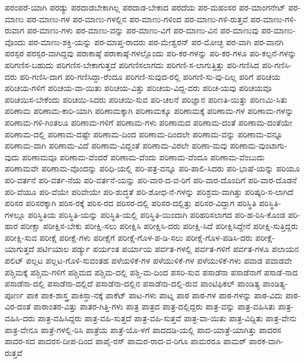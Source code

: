 {ಪರಂಪರೆ-ಯಾಗಿ
ಪರಡ್ಯು
ಪರದಾಡಬೇಕಾಗಿಲ್ಲ
ಪರದಾಡ-ಬೇಕಾದ
ಪರದೆಯ
ಪರ-ಮಹಂಸರ
ಪರ-ಮಾಂಗನೇಟ್
ಪರ-ಮಾಣು
ಪರ-ಮಾಣು-ಗಳ
ಪರ-ಮಾಣು-ಗಳಲ್ಲಿನ
ಪರ-ಮಾಣು-ಗಳಿಂದ
ಪರ-ಮಾಣು-ಗಳಿ-ರುತ್ತವೆ
ಪರ-ಮಾಣು-ಗಳಿ-ರುವಾಗ
ಪರ-ಮಾಣು-ಗಳು
ಪರ-ಮಾಣು-ವನ್ನು
ಪರ-ಮಾಣು-ವಿಗೆ
ಪರ-ಮಾಣು-ವಿನ
ಪರ-ಮಾಣುವು
ಪರ-ಮಾಣು-ವೊಂದು
ಪರ-ಮಾಣು-ಶಕ್ತಿ-ಯನ್ನು
ಪರ-ಮಾಪ್ತ-ರಾದರು
ಪರ-ಮೇಶ್ವರನ್
ಪರ-ಮೋಚ್ಛ
ಪರ-ವಾಗಿ
ಪರ-ವಾನಗಿ
ಪರಸ್ಪರ
ಪರಸ್ಪರ-ವಾಗಿದ್ದವು
ಪರಾಕಾಷ್ಠೆ
ಪರಾಕಾಷ್ಠೆ-ಗಳಲ್ಲೊಂದು
ಪರಿ-ಕರ-ಗಳನ್ನು
ಪರಿ-ಕರ-ಗಳೂ
ಪರಿ-ಕಲ್ಪನೆ-ಗಳನ್ನು
ಪರಿಗಣಿಸ-ಬಹುದು
ಪರಿಗಣಿಸ-ಬೇಕಾಗುತ್ತದೆ
ಪರಿಗಣಿಸಲಾಗದು
ಪರಿಗಣಿ-ಸ-ಲಾಗುತ್ತಿತ್ತು
ಪರಿ-ಗಣಿಸಿದ
ಪರಿ-ಗಣಿಸಿ-ದರು
ಪರಿ-ಗಣಿಸಿ-ದಾಗ
ಪರಿ-ಗಣಿಸಿದ್ದಾ-ರೆಂದೂ
ಪರಿಗಣಿ-ಸುವುದ-ರಲ್ಲಿ
ಪರಿಗಣಿ-ಸು-ವು-ದಿಲ್ಲ
ಪರಿಗೆ
ಪರಿಚಯ
ಪರಿಚಯ-ಗಳಿಗೆ
ಪರಿಚಯ-ವಾ-ಯಿತು
ಪರಿಚಯ-ವಿತ್ತು
ಪರಿಚಯ-ವಿದ್ದ-ವರು
ಪರಿಚ-ಯವು
ಪರಿಚಯವೂ
ಪರಿಚಯಿಸ-ಬೇಕೆಂದು
ಪರಿಚಯಿ-ಸಿದರು
ಪರಿಚಯಿ-ಸುವ
ಪರಿ-ಚಲನೆ
ಪರಿಜ್ಞಾನ
ಪರಿಣತಿ-ಯಿತ್ತು
ಪರಿಣಮಿ-ಸಿತು
ಪರಿಣಾಮ
ಪರಿಣಾಮ-ಕಾರಿ-ಯಾಗಿ
ಪರಿಣಾಮಕ್ಕಾಗಿ
ಪರಿಣಾಮಕ್ಕೂ
ಪರಿಣಾಮಕ್ಕೆ
ಪರಿಣಾಮ-ಗಳ
ಪರಿಣಾಮ-ಗಳನ್ನು
ಪರಿಣಾಮ-ಗಳಿ-ಗಿಂತಲೂ
ಪರಿಣಾಮ-ಗಳಿಗೆ
ಪರಿಣಾಮ-ಗಳು
ಪರಿಣಾಮದ
ಪರಿಣಾಮ-ದಂತೆ
ಪರಿಣಾಮ-ದಂತೆಯೇ
ಪರಿಣಾಮ-ದಲ್ಲಿ
ಪರಿಣಾಮ-ದಷ್ಟೇ
ಪರಿಣಾಮ-ದಿಂದ
ಪರಿಣಾಮ-ದಿಂದಲೇ
ಪರಿಣಾಮ-ವನ್ನು
ಪರಿಣಾಮ-ವನ್ನೂ
ಪರಿಣಾಮ-ವಾಗಿ
ಪರಿಣಾಮ-ವಿದೆ
ಪರಿಣಾಮ-ವಿದ್ದಂತೆ
ಪರಿಣಾಮ-ವಿರಲೇ
ಪರಿಣಾ-ಮವು
ಪರಿಣಾಮ-ವುಂಟಾಗು-ವುದು
ಪರಿಣಾಮವೂ
ಪರಿಣಾಮ-ವೆಂದರೆ
ಪರಿಣಾಮ-ವೆಂದು
ಪರಿಣಾಮ-ವೆಂದೂ
ಪರಿಣಾಮ-ವೆಂಬುದು
ಪರಿಣಾಮವೇ
ಪರಿಣಾಮ-ವೊಂದನ್ನು
ಪರಿಧಿ-ಯಲ್ಲಿ
ಪರಿ-ಪತ್ರ-ವನ್ನೂ
ಪರಿ-ಪಾಲಿ-ಸಿದರು
ಪರಿ-ಭಾಷೆ-ಯನ್ನು
ಪರಿಯೂ
ಪರಿ-ವರ್ತನೆ
ಪರಿ-ವರ್ತ-ನೆಯ
ಪರಿ-ವರ್ತನೆ-ಯನ್ನು
ಪರಿ-ವಾರ-ದ-ವ-ರಿಗೆ
ಪರಿ-ವಾರ-ದೊಂದಿಗೆ
ಪರಿ-ವಾರ-ದೊಡನೆ
ಪರಿ-ವೆಯೂ
ಪರಿ-ವೆಯೇ
ಪರಿವೇಯೇ
ಪರಿ-ಶುದ್ಧತೆ
ಪರಿ-ಶೋಧ-ನೆ-ಗಳನ್ನು
ಪರಿಶ್ರಮ-ವಾಗಿತ್ತು
ಪರಿಷ್ಕರಿ-ಸ-ಲಾಗಿದೆ
ಪರಿಸರ
ಪರಿಸರಕ್ಕಾಗಿ
ಪರಿಸ-ರಕ್ಕೆ
ಪರಿಸ-ರದ
ಪರಿಸರ-ದಲ್ಲಿ
ಪರಿಸರ-ದಲ್ಲಿತ್ತು
ಪರಿಸರ-ವಿದ್ದಾಗ
ಪರಿಸ್ಥಿತಿ
ಪರಿಸ್ಥಿತಿ-ಗಳಲ್ಲೂ
ಪರಿಸ್ಥಿತಿಯ
ಪರಿಸ್ಥಿತಿ-ಯನ್ನು
ಪರಿಸ್ಥಿತಿ-ಯಲ್ಲಿ
ಪರಿಸ್ಥಿತಿ-ಯಿಂದಾಗಿ
ಪರಿಹರಿಸಲಾಗದ
ಪರಿ-ಹ-ರಿಸಿ-ಕೊಂಡ
ಪರಿ-ಹಾರ
ಪರೀಕ್ಷಾ
ಪರೀಕ್ಷಿಸ-ಬೇಕು
ಪರೀಕ್ಷಿ-ಸಲು
ಪರೀಕ್ಷಿಸಿ
ಪರೀಕ್ಷಿಸಿ-ದರು
ಪರೀಕ್ಷಿ-ಸಿದೆ
ಪರೀಕ್ಷಿಸಿದ್ದೇನೆ
ಪರೀಕ್ಷಿ-ಸುತ್ತಿದ್ದರು
ಪರೀಕ್ಷಿ-ಸುವ
ಪರೀಕ್ಷೆ
ಪರೀಕ್ಷೆ-ಗಳು
ಪರೀಕ್ಷೆಗೆ
ಪರೀಕ್ಷೆ-ಗೊಳ-ಪ-ಡಿ-ಸಲು
ಪರೀಕ್ಷೆ-ಗೊಳ-ಪಡಿಸಿ-ದರು
ಪರೀಕ್ಷೆ-ಯಾಗುತ್ತದೆ
ಪರ್ಟಿಯಾಲ
ಪರ್ಡ್ಯು
ಪರ್ಯಂತ
ಪರ್ಯಾಯ
ಪರ್ವತ-ಗಳಲ್ಲಿ
ಪರ್ವತ-ಗಳಿಗೆ
ಪರ್ವತ-ಗಳೂ
ಪಲಾಯನ
ಪಲಿಟ್
ಪಲ್ಲಟ
ಪಲ್ಲಟ-ಗೊಳಿ-ಸುವಂತಹ
ಪಳೆಯಳಿಕೆ-ಗಳ
ಪಳೆಯುಳಿಕೆ-ಗಳ
ಪಳೆಯುಳಿಕೆ-ಗಳು
ಪವಾಡ
ಪವಾಡವೇ
ಪಶ್ಚಿಮಕ್ಕೆ
ಪಶ್ಚಿಮ-ಗಳಿಗೆ
ಪಶ್ಚಿಮದ
ಪಶ್ಚಿಮ-ದಲ್ಲಿ
ಪಶ್ಚಿ-ಮ-ದಿಂದ
ಪಸರಿ-ಸುವ
ಪಸಾಡೆನಾ
ಪಸಾಡೆನಾಗೆ
ಪಸಾಡೆ-ನಾದ
ಪಸಾಡೆನಾ-ದಲ್ಲಿ
ಪಸಾಡೆನಾ-ದಲ್ಲಿದೆ
ಪಸಾಡೆನಾ-ದಲ್ಲಿನ
ಪಸಾಡೆನಾ-ದಲ್ಲಿ-ರುವ
ಪಾಂಟಿಫಿಕಲ್
ಪಾಂಡಿತ್ಯ
ಪಾಂಡಿತ್ಯ-ಪೂರ್ಣ
ಪಾಕ
ಪಾಕ-ಶಾಸ್ತ್ರ
ಪಾಕಿಸ್ತಾ-ನಕ್ಕೆ
ಪಾಕೆಟ್
ಪಾಟ-ಗಳು
ಪಾಟ್ನ
ಪಾಠ
ಪಾಠ-ಗಳ
ಪಾಠ-ಗಳನ್ನು
ಪಾಠ-ವಿದು
ಪಾಠ-ವಿರ-ದಂತೆ
ಪಾಠಾಂತರ-ವಿತ್ತು
ಪಾತರ-ಗಿತ್ತಿ-ಗಳು
ಪಾತ್ರ
ಪಾತ್ರದ
ಪಾತ್ರ-ದಲ್ಲಿದ್ದರು
ಪಾತ್ರ-ವನ್ನು
ಪಾತ್ರ-ವಹಿಸಿತು
ಪಾತ್ರ-ವಹಿಸಿ-ದರು
ಪಾತ್ರ-ವಹಿಸಿದ್ದರು
ಪಾತ್ರ-ವಹಿ-ಸುತ್ತದೆ
ಪಾತ್ರ-ವಹಿ-ಸುತ್ತವೆ
ಪಾತ್ರ-ವಾ-ಯಿತು
ಪಾತ್ರ-ವಿದ್ದಿತು
ಪಾತ್ರ-ವೇನು
ಪಾತ್ರ-ವೇನೂ
ಪಾತ್ರೆ-ಗಳಲ್ಲಿ-ರಿಸಿ
ಪಾತ್ರೆಯ
ಪಾತ್ರೆ-ಯೊ-ಳಗೆ
ಪಾದದಡಿ-ಯಲ್ಲಿ
ಪಾದ-ಯಾತ್ರೆ-ಯಾಗಿತ್ತು
ಪಾದರಸ
ಪಾದರ-ಸದ
ಪಾದರಸ-ದೀಪ-ದಿಂದ
ಪಾಪೈ-ರಸ್
ಪಾಮರ-ರಾದ-ವ-ರಿಗೂ
ಪಾಮರರೂ
ಪಾಮರ್
ಪಾರಕ-ವಾಗಿ-ರುತ್ತವೆ
}
